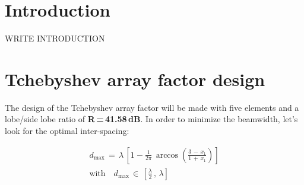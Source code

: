 \documentclass{ieeeojies}
\begin{document}
\titlepgskip=-15pt

\maketitle

\section{Introduction}
\label{sec:introduction}
WRITE INTRODUCTION 

\textcolor{blue}{\lipsum[1-4]}

\section{Tchebyshev array factor design}

The design of the Tchebyshev array factor will be made with five elements and a lobe/side lobe ratio of \textbf{R\,=\,41.58\,dB}. In order to minimize the beamwidth, let's look for the optimal inter-spacing:

\begin{equation}
	\begin{split}
	d_{\max}\,=\,\lambda\,\left[1-\frac{1}{2\pi}\,\arccos\left(\frac{3\,-\,x_1}{1\,+\,x_1}\right)\right]
	\\ \text{with}\quad d_{\max}\,\in\,\left[\frac{\lambda}{2}\,,\,\lambda\right]
	\end{split}
\end{equation}
\end{document}
